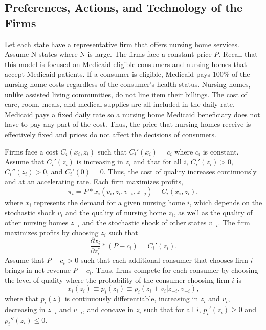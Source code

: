 \documentclass[../Main.tex]{subfiles}
\begin{document}
\subsection{Preferences, Actions, and Technology of the Firms}
Let each state have a representative firm that offers nursing home services. Assume N states where N is large. The firms face a constant price $P$. Recall that this model is focused on Medicaid eligible consumers and nursing homes that accept Medicaid patients. If a consumer is eligible, Medicaid pays 100\% of the nursing home costs regardless of the consumer's health status. Nursing homes, unlike assisted living communities, do not line item their billings. The cost of care, room, meals, and medical supplies are all included in the daily rate. Medicaid pays a fixed daily rate so a nursing home Medicaid beneficiary does not have to pay any part of the cost. Thus, the price that nursing homes receive is effectively fixed and prices do not affect the decisions of consumers.

Firms face a cost $C_i(x_i, z_i)$ such that $C_i'(x_i)= c_i$ where $c_i$ is constant. Assume that $C_i'(z_i)$ is increasing in $z_i$ and that for all $i$, $C_i'(z_i)>0$, $C_i''(z_i)>0$, and $C_i'(0)=0$. Thus, the cost of quality increases continuously and at an accelerating rate. Each firm maximizes profits, \begin{equation}\pi_i = P*x_i(v_i, z_i, v_{-i}, z_{-j}) -C_i(x_i, z_i), \end{equation} 
where $x_i$ represents the demand for a given nursing home $i$, which depends on the stochastic shock $v_i$ and the quality of nursing home $z_i$, as well as the quality of other nursing homes $z_{-i}$ and the stochastic shock of other states $v_{-i}$. The firm maximizes profits by choosing $z_i$ such that \begin{equation} \frac{\partial x_i}{\partial z_i^*}*(P-c_i)= C_i'(z_i). \end{equation} Assume that $P - c_i > 0$ such that each additional consumer that chooses firm $i$ brings in net revenue $P - c_i$. Thus, firms compete for each consumer by choosing the level of quality where the probability of the consumer choosing firm $i$ is \begin{equation} x_{i}(z_i) \equiv p_i(z_i) \equiv p_i(z_i + v_i |z_{-i}, v_{-i}), \end{equation}
where that $p_{i}(z)$ is continuously differentiable, increasing in $z_i$ and $v_i$, decreasing in $z_{-i}$ and $v_{-i}$, and concave in $z_i$ such that for all $i$, $p_{i}'(z_i)\geq 0$ and $p_{i}''(z_i) \leq 0$.
\end{document}
